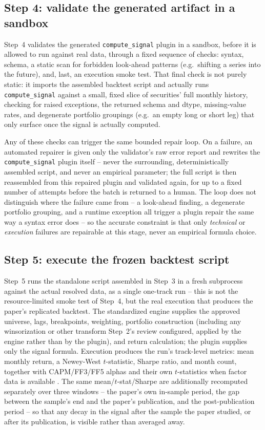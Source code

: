 \subsection{Step 4: validate the generated artifact in a sandbox}

Step~4 validates the generated \texttt{compute\_signal} plugin in a sandbox,
before it is allowed to run against real data, through a fixed sequence of
checks: syntax, schema, a static scan for forbidden look-ahead patterns
(e.g.\ shifting a series into the future), and, last, an execution smoke
test. That final check is not purely static: it imports the assembled
backtest script and actually runs
\texttt{compute\_signal} against a small, fixed slice of securities' full
monthly history, checking for raised exceptions, the returned schema and
dtype, missing-value rates, and degenerate portfolio groupings (e.g.\ an
empty long or short leg) that only surface once the signal is actually
computed.

Any of these checks can trigger the same bounded repair loop. On a failure,
an automated repairer is given only the validator's raw error report and
rewrites the \texttt{compute\_signal} plugin itself -- never the surrounding,
deterministically assembled script, and never an empirical parameter; the
full script is then reassembled from this repaired plugin and validated
again, for up to a fixed number of attempts before the batch is returned to a
human. The loop does not distinguish where the failure came from -- a
look-ahead finding, a degenerate portfolio grouping, and a runtime exception
all trigger a plugin repair the same way a syntax error does -- so the
accurate constraint is that only \emph{technical} or \emph{execution}
failures are repairable at this stage, never an empirical formula choice.

\subsection{Step 5: execute the frozen backtest script}

Step~5 runs the standalone script assembled in Step~3 in a fresh subprocess
against the actual resolved data, as a single one-track run -- this is not
the resource-limited smoke test of Step~4, but the real execution that
produces the paper's replicated backtest. The standardized engine supplies the
approved universe, lags, breakpoints, weighting, portfolio construction
(including any winsorization or other transform Step~2's review configured,
applied by the engine rather than by the plugin), and return calculation; the
plugin supplies only the signal formula. Execution produces the run's
track-level metrics: mean monthly return, a Newey-West $t$-statistic, Sharpe
ratio, and month count, together with CAPM/FF3/FF5 alphas and their own
$t$-statistics when factor data is available
\citep{FamaFrench1993,FamaFrench2015}. The same mean/$t$-stat/Sharpe
are additionally recomputed separately over three windows -- the paper's own
in-sample period, the gap between the sample's end and the paper's
publication, and the post-publication period -- so that any decay in the
signal after the sample the paper studied, or after its publication, is
visible rather than averaged away.

